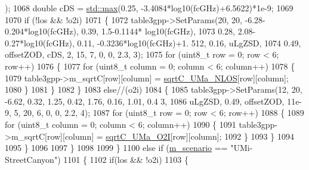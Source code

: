 \begin{DoxyCode}
      );
1068                         \textcolor{keywordtype}{double} cDS = \hyperlink{80211b_8c_affe776513b24d84b39af8ab0930fef7f}{std::max}(0.25, -3.4084*log10(fcGHz)+6.5622)*1e-9;
1069 
1070                         \textcolor{keywordflow}{if} (!los && !o2i)
1071                         \{
1072                                 table3gpp->SetParams(20, 20, -6.28-0.204*log10(fcGHz), 0.39, 1.5-0.1144*
      log10(fcGHz),
1073                                                 0.28, 2.08-0.27*log10(fcGHz), 0.11, -0.3236*log10(fcGHz)+1.
      512, 0.16, uLgZSD,
1074                                                 0.49, offsetZOD, cDS, 2, 15, 7, 0, 0, 2.3, 3);
1075                                 \textcolor{keywordflow}{for} (uint8\_t row = 0; row < 6; row++)
1076                                 \{
1077                                         \textcolor{keywordflow}{for} (uint8\_t column = 0; column < 6; column++)
1078                                         \{
1079                                                 table3gpp->m\_sqrtC[row][column] = 
      \hyperlink{namespacens3_ad5e4bf11a5acb312f0bc8a5326e39df2}{sqrtC\_UMa\_NLOS}[row][column];
1080                                         \}
1081                                 \}
1082                         \}
1083                         \textcolor{keywordflow}{else}\textcolor{comment}{//(o2i)}
1084                         \{
1085                                 table3gpp->SetParams(12, 20, -6.62, 0.32, 1.25, 0.42, 1.76, 0.16, 1.01, 0.4
      3,
1086                                                 uLgZSD, 0.49, offsetZOD, 11e-9, 5, 20, 6, 0, 0, 2.2, 4);
1087                                 \textcolor{keywordflow}{for} (uint8\_t row = 0; row < 6; row++)
1088                                 \{
1089                                         \textcolor{keywordflow}{for} (uint8\_t column = 0; column < 6; column++)
1090                                         \{
1091                                                 table3gpp->m\_sqrtC[row][column] = 
      \hyperlink{namespacens3_a39f2ef4de462777b91687b3f7f9d72f8}{sqrtC\_UMa\_O2I}[row][column];
1092                                         \}
1093                                 \}
1094 
1095                         \}
1096 
1097                 \}
1098 
1099         \}
1100         \textcolor{keywordflow}{else} \textcolor{keywordflow}{if} (\hyperlink{classns3_1_1MmWave3gppChannel_ae1f263fbc87682905d563221343e4447}{m\_scenario} == \textcolor{stringliteral}{"UMi-StreetCanyon"})
1101         \{
1102                 \textcolor{keywordflow}{if}(los && !o2i)
1103                 \{

\end{DoxyCode}
